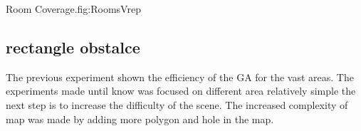  
\begin{mfigures}[!]{  Room Coverage.}{fig:RoomsVrep} \centering
{}
\hspace{1cm}
\hspace{1cm}

\tabsimupose
\end{mfigures}



	\subsection{rectangle obstalce}

The previous experiment shown the efficiency of the GA for the vast areas. The experiments made until know was focused on different area relatively simple the next step is to increase the difficulty of the scene. The  increased complexity of map was made by adding more polygon  and  hole in the map.

